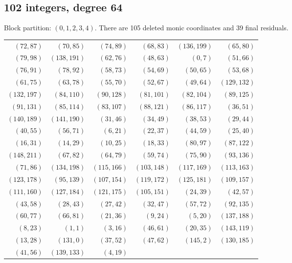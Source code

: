 \documentclass[10pt,letterpaper]{article}
\theoremstyle{remark}\newtheorem{remark}[theorem]{Remark}
\begin{document}
\subsection{102 integers, degree 64}
Block partition: $(0,1,2,3,4)$.
There are 105 deleted monic coordinates and 39 final residuals.
\begin{center}\small\begin{tabular}{rrrrrr}\toprule
$(72,87)$ & $(70,85)$ & $(74,89)$ & $(68,83)$ & $(136,199)$ & $(65,80)$\\
$(79,98)$ & $(138,191)$ & $(62,76)$ & $(48,63)$ & $(0,7)$ & $(51,66)$\\
$(76,91)$ & $(78,92)$ & $(58,73)$ & $(54,69)$ & $(50,65)$ & $(53,68)$\\
$(61,75)$ & $(63,78)$ & $(55,70)$ & $(52,67)$ & $(49,64)$ & $(129,132)$\\
$(132,197)$ & $(84,110)$ & $(90,128)$ & $(81,101)$ & $(82,104)$ & $(89,125)$\\
$(91,131)$ & $(85,114)$ & $(83,107)$ & $(88,121)$ & $(86,117)$ & $(36,51)$\\
$(140,189)$ & $(141,190)$ & $(31,46)$ & $(34,49)$ & $(38,53)$ & $(29,44)$\\
$(40,55)$ & $(56,71)$ & $(6,21)$ & $(22,37)$ & $(44,59)$ & $(25,40)$\\
$(16,31)$ & $(14,29)$ & $(10,25)$ & $(18,33)$ & $(80,97)$ & $(87,122)$\\
$(148,211)$ & $(67,82)$ & $(64,79)$ & $(59,74)$ & $(75,90)$ & $(93,136)$\\
$(71,86)$ & $(134,198)$ & $(115,166)$ & $(103,148)$ & $(117,169)$ & $(113,163)$\\
$(123,178)$ & $(95,139)$ & $(107,154)$ & $(119,172)$ & $(125,181)$ & $(109,157)$\\
$(111,160)$ & $(127,184)$ & $(121,175)$ & $(105,151)$ & $(24,39)$ & $(42,57)$\\
$(43,58)$ & $(28,43)$ & $(27,42)$ & $(32,47)$ & $(57,72)$ & $(92,135)$\\
$(60,77)$ & $(66,81)$ & $(21,36)$ & $(9,24)$ & $(5,20)$ & $(137,188)$\\
$(8,23)$ & $(1,1)$ & $(3,16)$ & $(46,61)$ & $(20,35)$ & $(143,119)$\\
$(13,28)$ & $(131,0)$ & $(37,52)$ & $(47,62)$ & $(145,2)$ & $(130,185)$\\
$(41,56)$ & $(139,133)$ & $(4,19)$ &  &  & \\
\bottomrule\end{tabular}\end{center}
\end{document}
